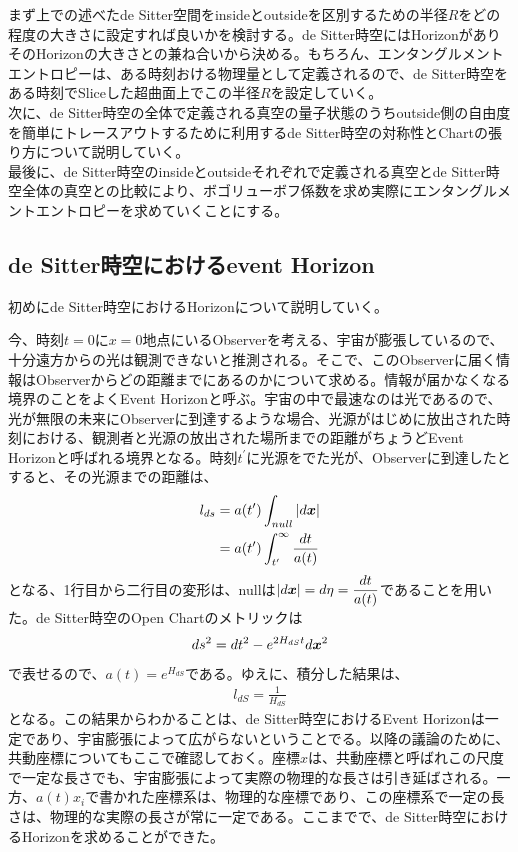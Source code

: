 まず上での述べたde Sitter空間をinsideとoutsideを区別するための半径$R$をどの程度の大きさに設定すれば良いかを検討する。de Sitter時空にはHorizonがありそのHorizonの大きさとの兼ね合いから決める。もちろん、エンタングルメントエントロピーは、ある時刻おける物理量として定義されるので、de Sitter時空をある時刻でSliceした超曲面上でこの半径$R$を設定していく。
\\

次に、de Sitter時空の全体で定義される真空の量子状態のうちoutside側の自由度を簡単にトレースアウトするために利用するde Sitter時空の対称性とChartの張り方について説明していく。
\\

最後に、de Sitter時空のinsideとoutsideそれぞれで定義される真空とde Sitter時空全体の真空との比較により、ボゴリューボフ係数を求め実際にエンタングルメントエントロピーを求めていくことにする。




\subsection{de Sitter時空におけるevent Horizon}
初めにde Sitter時空におけるHorizonについて説明していく。

今、時刻$t=0$に$x=0$地点にいるObserverを考える、宇宙が膨張しているので、十分遠方からの光は観測できないと推測される。そこで、このObserverに届く情報はObserverからどの距離までにあるのかについて求める。情報が届かなくなる境界のことをよくEvent Horizonと呼ぶ。宇宙の中で最速なのは光であるので、光が無限の未来にObserverに到達するような場合、光源がはじめに放出された時刻における、観測者と光源の放出された場所までの距離がちょうどEvent Horizonと呼ばれる境界となる。時刻$t^{\prime}$に光源をでた光が、Observerに到達したとすると、その光源までの距離は、
\begin{align}
  l_{ds}&=a(t^{\prime})\int_{null}|d\mbox{\boldmath$x$}|\\
  &=a(t^{\prime})\int^{\infty}_{t^{\prime}}\frac{dt}{a(t)}
\end{align}
となる、1行目から二行目の変形は、nullは$|d\mbox{\boldmath$x$}|=d\eta=\dfrac{dt}{a(t)}$であることを用いた。de Sitter時空のOpen Chartのメトリックは
\begin{align}
ds^2=dt^2-e^{2H_{dS}t}d\mbox{\boldmath$x$}^2
\end{align}
で表せるので、$a(t)=e^{H_{dS}}$である。ゆえに、積分した結果は、
\begin{align}
l_{dS}=\frac{1}{H_{dS}}
\end{align}
となる。この結果からわかることは、de Sitter時空におけるEvent Horizonは一定であり、宇宙膨張によって広がらないということでる。以降の議論のために、共動座標についてもここで確認しておく。座標$x$は、共動座標と呼ばれこの尺度で一定な長さでも、宇宙膨張によって実際の物理的な長さは引き延ばされる。一方、$a(t)x_i$で書かれた座標系は、物理的な座標であり、この座標系で一定の長さは、物理的な実際の長さが常に一定である。ここまでで、de Sitter時空におけるHorizonを求めることができた。
\\

